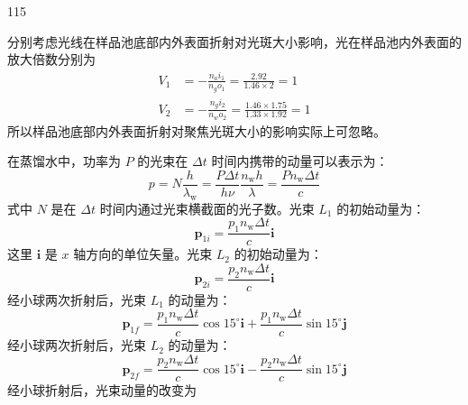\begin{solution}{115}
\begin{subsolution}
        分别考虑光线在样品池底部内外表面折射对光斑大小影响，光在样品池内外表面的放大倍数分别为
        \begin{align}
            V_{1} &= - \frac{n_{a} i_{1}}{n_{g} o_{1}} = \frac{2.92}{1.46 \times 2} = 1 \label{eq:10.s115} \\
            V_{2} &= - \frac{n_{g} i_{2}}{n_{w} o_{2}} = \frac{1.46 \times 1.75}{1.33 \times 1.92} = 1 \label{eq:11.s115}
        \end{align}
        所以样品池底部内外表面折射对聚焦光斑大小的影响实际上可忽略。
    \end{subsolution}
    \begin{subsolution}
        在蒸馏水中，功率为 $P$ 的光束在 $\Delta t$ 时间内携带的动量可以表示为：
        \begin{equation}
            p = N \frac{h}{\lambda_{\mathrm{w}}} = \frac{P \Delta t}{h \nu} \frac{n_{\mathrm{w}} h}{\lambda} = \frac{P n_{\mathrm{w}} \Delta t}{c}
            \label{eq:12.s115}
        \end{equation}
        式中 $N$ 是在 $\Delta t$ 时间内通过光束横截面的光子数。光束 $L_{1}$ 的初始动量为：
        \begin{equation}
            \boldsymbol{p}_{1i} = \frac{p_{1} n_{\mathrm{w}} \Delta t}{c} \boldsymbol{i}
            \label{eq:13.s115}
        \end{equation}
        这里 $\boldsymbol{i}$ 是 $x$ 轴方向的单位矢量。光束 $L_{2}$ 的初始动量为：
        \begin{equation}
            \boldsymbol{p}_{2i} = \frac{p_{2} n_{\mathrm{w}} \Delta t}{c} \boldsymbol{i}
            \label{eq:14.s115}
        \end{equation}
        经小球两次折射后，光束 $L_{1}$ 的动量为：
        \begin{equation}
            \boldsymbol{p}_{1f} = \frac{p_{1} n_{\mathrm{w}} \Delta t}{c} \cos 15^{\circ} \boldsymbol{i} + \frac{p_{1} n_{\mathrm{w}} \Delta t}{c} \sin 15^{\circ} \boldsymbol{j}
            \label{eq:15.s115}
        \end{equation}
        经小球两次折射后，光束 $L_{2}$ 的动量为：
        \begin{equation}
            \boldsymbol{p}_{2f} = \frac{p_{2} n_{\mathrm{w}} \Delta t}{c} \cos 15^{\circ} \boldsymbol{i} - \frac{p_{2} n_{\mathrm{w}} \Delta t}{c} \sin 15^{\circ} \boldsymbol{j}
            \label{eq:16.s115}
        \end{equation}
        经小球折射后，光束动量的改变为
        \begin{equation}

\end{equation}
\end{subsolution}
\end{solution}
